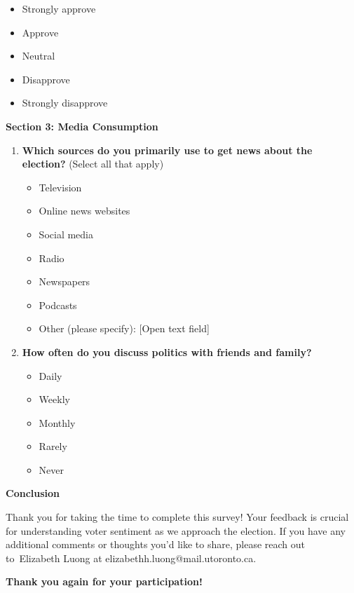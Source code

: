 \documentclass[
  letterpaper,
  DIV=11,
  numbers=noendperiod]{scrartcl}
\begin{document}
\begin{enumerate}
  \begin{itemize}
  \item
    Strongly approve
  \item
    Approve
  \item
    Neutral
  \item
    Disapprove
  \item
    Strongly disapprove
  \end{itemize}
\end{enumerate}

\textbf{Section 3: Media Consumption}

\begin{enumerate}
\def\labelenumi{\arabic{enumi}.}
\setcounter{enumi}{9}
\item
  \textbf{Which sources do you primarily use to get news about the
  election?} (Select all that apply)

  \begin{itemize}
  \item
    Television
  \item
    Online news websites
  \item
    Social media
  \item
    Radio
  \item
    Newspapers
  \item
    Podcasts
  \item
    Other (please specify): {[}Open text field{]}
  \end{itemize}
\item
  \textbf{How often do you discuss politics with friends and family?}

  \begin{itemize}
  \item
    Daily
  \item
    Weekly
  \item
    Monthly
  \item
    Rarely
  \item
    Never
  \end{itemize}
\end{enumerate}

\textbf{Conclusion}

Thank you for taking the time to complete this survey! Your feedback is
crucial for understanding voter sentiment as we approach the election.
If you have any additional comments or thoughts you'd like to share,
please reach out to~Elizabeth Luong at
elizabethh.luong@mail.utoronto.ca.

\textbf{Thank you again for your participation!}
\end{document}
